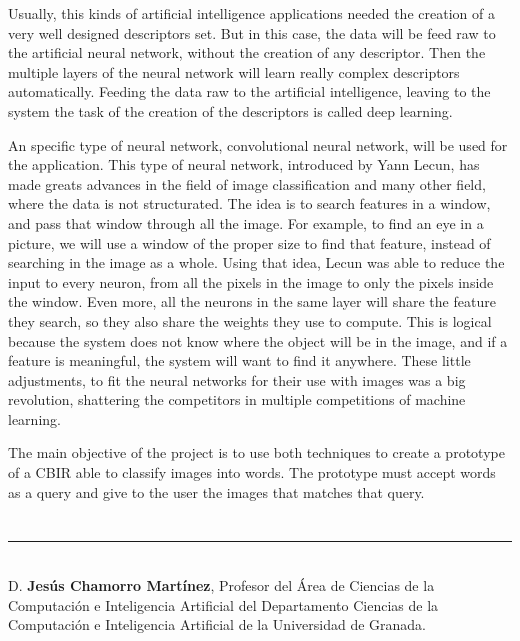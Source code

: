 Usually, this kinds of artificial intelligence applications needed the creation of a very well designed descriptors set. But in this case, the data will be feed raw to the artificial neural network, without the creation of any descriptor. Then the multiple layers of the neural network will learn really complex descriptors automatically.  Feeding the data raw to the artificial intelligence, leaving to the system the task of the creation of the descriptors is called deep learning.

An specific type of neural network, convolutional neural network, will be used for the application. This type of neural network, introduced by Yann Lecun, has made greats advances in the field of image classification and many other field, where the data is not structurated. The idea is to search features in a window, and pass that window through all the image. For example, to find an eye in a picture, we will use a window of the proper size to find that feature, instead of searching in the image as a whole. Using that idea, Lecun was able to reduce the input to every neuron, from all the pixels in the image to only the pixels inside the window. Even more, all the neurons in the same layer will share the feature they search, so they also share the weights they use to compute. This is logical because the system does not know where the object will be in the image, and if a feature is meaningful, the system will want to find it anywhere. These little adjustments, to fit the neural networks for their use with images was a big revolution, shattering the competitors in multiple competitions of machine learning.

The main objective of the project is to use both techniques to create a prototype of a CBIR able to classify images into words. The prototype must accept words as a query and give to the user the images that matches that query.\\


\chapter*{}
\thispagestyle{empty}

\noindent\rule[-1ex]{\textwidth}{2pt}\\[4.5ex]

D. \textbf{Jesús Chamorro Martínez}, Profesor del Área de Ciencias de la Computación e Inteligencia Artificial del Departamento Ciencias de la Computación e Inteligencia Artificial de la Universidad de Granada.

